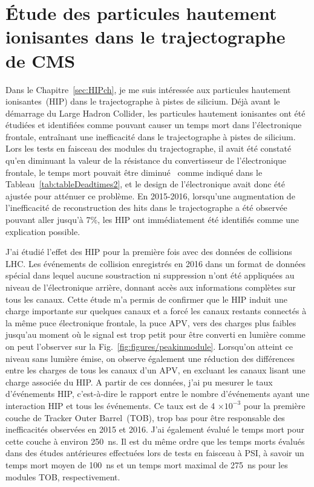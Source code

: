 \section{Étude des particules hautement ionisantes dans le trajectographe de CMS}

Dans le Chapitre~\ref{sec:HIPch}, je me suis intéressée aux particules hautement ionisantes~(HIP) dans le trajectographe à pistes de silicium. Déjà avant le démarrage du Large Hadron Collider, les particules hautement ionisantes ont été étudiées et identifiées comme pouvant causer un temps mort dans l'électronique frontale, entraînant une inefficacité dans le trajectographe à pistes de silicium. Lors les tests en faisceau des modules du trajectographe, il avait été constaté qu'en diminuant la valeur de la résistance du convertisseur de l’électronique frontale, le temps mort pouvait être diminué~\cite{Bainbridge:2004jc} comme indiqué dans le Tableau~\ref{tab:tableDeadtimes2}, et le design de l'électronique avait donc été ajustée pour atténuer ce problème. En 2015-2016, lorsqu'une augmentation de l'inefficacité de reconstruction des hits dans le trajectographe a été observée pouvant aller jusqu'à 7\%, les HIP ont immédiatement été identifiés comme une explication possible. 

J'ai étudié l'effet des HIP pour la première fois avec des données de collisions LHC. Les  événements de collision enregistrés en 2016 dans un format de données spécial dans lequel aucune soustraction ni suppression n'ont été appliquées au niveau de l'électronique arrière, donnant accès aux informations complètes sur tous les canaux. Cette étude m'a permis de confirmer que le HIP induit une charge importante sur quelques canaux et a forcé les canaux restants connectés à la même puce électronique frontale, la puce APV, vers des charges plus faibles jusqu'au moment où le signal est trop petit pour être converti en lumière comme on peut l'observer sur la Fig.~\ref{fig:figures/peakinmodule}. Lorsqu'on atteint ce niveau sans lumière émise, on observe également une réduction des différences entre les charges de tous les canaux d'un APV, en excluant les canaux lisant une charge associée du HIP. A partir de ces données, j'ai pu mesurer le taux d'événements HIP, c'est-à-dire  le rapport entre  le nombre d'événements ayant une interaction HIP et  tous les événements. Ce taux est de 4 $\times 10^{-3} $ pour la première couche de Tracker Outer Barrel~(TOB), trop bas pour être responsable des inefficacités observées en 2015 et 2016. J'ai également évalué le temps mort pour cette couche à environ 250~ns. Il est du même ordre que les temps morts évalués dans des études antérieures effectuées lors de tests en faisceau à PSI, à savoir un temps mort moyen de 100~ns et un temps mort  maximal de 275~ns pour les modules TOB, respectivement.

